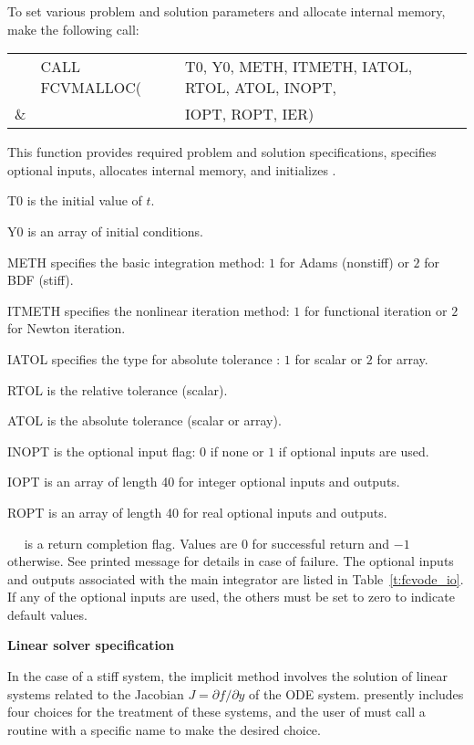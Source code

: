 \begin{Steps}
  To set various problem and solution parameters and allocate
  internal memory, make the following call:
  {
    \begin{tabular}[t]{@{}r@{}l@{}l@{}}
      &CALL FCVMALLOC(&T0, Y0, METH, ITMETH, IATOL, RTOL, ATOL, INOPT, \\
    \&&               &IOPT, ROPT, IER)
    \end{tabular}
  }
  {
    This function provides required problem and solution specifications, 
    specifies optional inputs,
    allocates internal memory, and initializes {\cvode}.
  }
  {
    \begin{args}[ITMETH ]
    \item[T0] is the initial value of $t$.
    \item[Y0] is an array of initial conditions.
    \item[METH] specifies the  basic integration method: 
      $1$ for Adams (nonstiff) or $2$ for BDF (stiff).
    \item[ITMETH] specifies the nonlinear iteration method: 
      $1$ for functional iteration or $2$ for Newton iteration.
    \item[IATOL] specifies the type for absolute tolerance :
      $1$ for scalar or $2$ for array.
    \item[RTOL] is the relative tolerance (scalar).
    \item[ATOL] is the absolute tolerance (scalar or array).
    \item[INOPT] is the optional input flag: $0$ if none or $1$ if optional 
      inputs are used.
    \item[IOPT] is an array of length 40 for integer optional inputs and outputs.
    \item[ROPT] is an array of length 40 for real optional inputs and outputs.
    \end{args}
  }
  {
    ~~ is a return completion flag.  Values are $0$ for successful return
    and $-1$ otherwise. See printed message for details in case of failure.
  }
  {
    The optional inputs and outputs associated with the main {\cvode} integrator
    are listed in Table~\ref{t:fcvode_io}.
    If any of the optional inputs are used, the others must be set
    to zero to indicate default values.
  }

\item\label{i:fcvode_lin_solv_spec} {\bf Linear solver specification} 
  
  In the case of a stiff system, the implicit  method involves the solution
  of linear systems related to the Jacobian $J = \partial f / \partial y$
  of the ODE system.  {\cvode} presently includes four choices for the treatment
  of these systems, and the user of {\fcvode} must call a routine with a
  specific name to make the desired choice.


\end{Steps}
